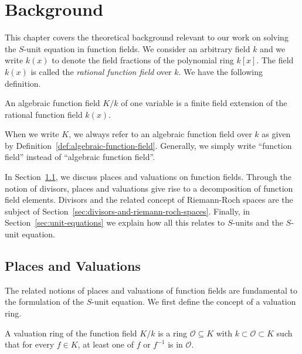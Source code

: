 
\chapter{Background}%
\label{chap:background}

This chapter covers the theoretical background relevant to our work on solving the \(S\)-unit equation in function fields. We consider an arbitrary field \(k\) and we write \(k(x)\) to denote the field fractions of the polynomial ring \(k[x]\). The field \(k(x)\) is called the \textit{rational function field} over \(k\). We have the following definition.

\begin{definition}%
  \label{def:algebraic-function-field}
  An algebraic function field \(K / k\) of one variable is a finite field extension of the rational function field \(k(x)\).
\end{definition}

When we write \(K\), we always refer to an algebraic function field over \(k\) as given by Definition~\ref{def:algebraic-function-field}. Generally, we simply write ``function field'' instead of ``algebraic function field''.

In Section~\ref{sec:places-and-valuations}, we discuss places and valuations on function fields. Through the notion of divisors, places and valuations give rise to a decomposition of function field elements. Divisors and the related concept of Riemann-Roch spaces are the subject of Section~\ref{sec:divisors-and-riemann-roch-spaces}. Finally, in Section~\ref{sec:unit-equations} we explain how all this relates to \(S\)-units and the \(S\)-unit equation.

\section{Places and Valuations}%
\label{sec:places-and-valuations}

The related notions of places and valuations of function fields are fundamental to the formulation of the \(S\)-unit equation. We first define the concept of a valuation ring.

\begin{definition}%
  \label{def:valuation-ring}
  A valuation ring of the function field \(K / k\) is a ring \(\mathcal{O} \subseteq K\) with \(k \subset \mathcal{O} \subset K\) such that for every \(f \in K\), at least one of \(f\) or \(f^{-1}\) is in \(\mathcal{O}\).
\end{definition}

